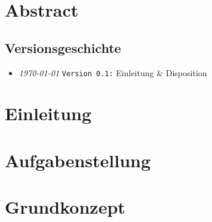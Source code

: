 \documentclass{fhnwreport/fhnwreport}
\begin{document}


\clearpage
\section*{Abstract}
\label{sec:abstract}



\clearpage
\pagestyle{empty}
{
    \renewcommand{\thispagestyle}[1]{}
    \tableofcontents
    \vspace{35mm}
    \subsection*{Versionsgeschichte}
    \begin{itemize}
        \item[]
            \emph{\today} \texttt{Version 0.1:} Einleitung \& Disposition
    \end{itemize}
}

\clearpage
\setcounter{page}{1}
\pagestyle{headings}

\clearpage
\section{Einleitung}
\label{sec:introduction}


\clearpage
\section{Aufgabenstellung}
\label{sec:aufgabenstellung}



\clearpage
\section{Grundkonzept}
\label{sec:grundkonzept}

\end{document}
